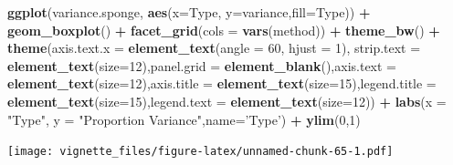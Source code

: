 \documentclass[]{book}
\newenvironment{Shaded}{\begin{snugshade}}{\end{snugshade}}
\newcommand{\KeywordTok}[1]{\textcolor[rgb]{0.13,0.29,0.53}{\textbf{#1}}}
\newcommand{\DataTypeTok}[1]{\textcolor[rgb]{0.13,0.29,0.53}{#1}}
\newcommand{\DecValTok}[1]{\textcolor[rgb]{0.00,0.00,0.81}{#1}}
\newcommand{\StringTok}[1]{\textcolor[rgb]{0.31,0.60,0.02}{#1}}
\newcommand{\OperatorTok}[1]{\textcolor[rgb]{0.81,0.36,0.00}{\textbf{#1}}}
\newcommand{\NormalTok}[1]{#1}
\begin{document}
\begin{Shaded}
\begin{Highlighting}[]
\KeywordTok{ggplot}\NormalTok{(variance.sponge, }\KeywordTok{aes}\NormalTok{(}\DataTypeTok{x=}\NormalTok{Type, }\DataTypeTok{y=}\NormalTok{variance,}\DataTypeTok{fill=}\NormalTok{Type)) }\OperatorTok{+}\StringTok{ }\KeywordTok{geom_boxplot}\NormalTok{() }\OperatorTok{+}\StringTok{ }\KeywordTok{facet_grid}\NormalTok{(}\DataTypeTok{cols =} \KeywordTok{vars}\NormalTok{(method)) }\OperatorTok{+}\StringTok{ }\KeywordTok{theme_bw}\NormalTok{() }\OperatorTok{+}\StringTok{ }\KeywordTok{theme}\NormalTok{(}\DataTypeTok{axis.text.x =} \KeywordTok{element_text}\NormalTok{(}\DataTypeTok{angle =} \DecValTok{60}\NormalTok{, }\DataTypeTok{hjust =} \DecValTok{1}\NormalTok{), }\DataTypeTok{strip.text =} \KeywordTok{element_text}\NormalTok{(}\DataTypeTok{size=}\DecValTok{12}\NormalTok{),}\DataTypeTok{panel.grid =} \KeywordTok{element_blank}\NormalTok{(),}\DataTypeTok{axis.text =} \KeywordTok{element_text}\NormalTok{(}\DataTypeTok{size=}\DecValTok{12}\NormalTok{),}\DataTypeTok{axis.title =} \KeywordTok{element_text}\NormalTok{(}\DataTypeTok{size=}\DecValTok{15}\NormalTok{),}\DataTypeTok{legend.title =} \KeywordTok{element_text}\NormalTok{(}\DataTypeTok{size=}\DecValTok{15}\NormalTok{),}\DataTypeTok{legend.text =} \KeywordTok{element_text}\NormalTok{(}\DataTypeTok{size=}\DecValTok{12}\NormalTok{)) }\OperatorTok{+}\StringTok{ }\KeywordTok{labs}\NormalTok{(}\DataTypeTok{x =} \StringTok{"Type"}\NormalTok{, }\DataTypeTok{y =} \StringTok{"Proportion Variance"}\NormalTok{,}\DataTypeTok{name=}\StringTok{'Type'}\NormalTok{) }\OperatorTok{+}\StringTok{ }\KeywordTok{ylim}\NormalTok{(}\DecValTok{0}\NormalTok{,}\DecValTok{1}\NormalTok{)}
\end{Highlighting}
\end{Shaded}

\texttt{[image: vignette\_files/figure-latex/unnamed-chunk-65-1.pdf]}
\end{document}
